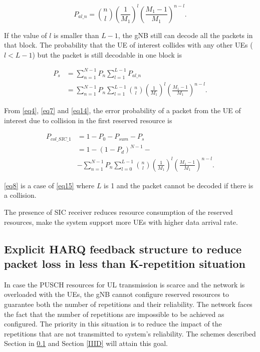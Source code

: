 \documentclass{ieeeaccess}
\begin{document}
\begin{equation}
P_{al\_n} = \binom {n}{l}\left(\frac{1}{M_{1}}\right)^{l}
\left(\frac {M_{1}-1}{M_{1}}\right)^{n-l}.\label{eq13}
\end{equation}

If the value of $l$ is smaller than $L-1$, the gNB still can decode all the packets in that block. The probability that the UE of interest collides with any other UEs ($l<L-1$) but the packet is still decodable in one block is

\begin{align}
P_{s} &= \sum_{n=1}^{N-1} P_{n}\sum_{l=1}^{L-1}P_{al\_n} \nonumber\\
 &= \sum_{n=1}^{N-1} P_{n}\sum_{l=1}^{L-1}\binom {n}{l}\left(\frac{1}{M_{1}}\right)^{l}
\left(\frac {M_{1}-1}{M_{1}}\right)^{n-l}.\label{eq14}
\end{align}

From \eqref{eq4}, \eqref{eq7} and \eqref{eq14}, the error probability of a packet from the UE of interest due to collision in the first reserved resource is

\begin{align}
P_{col\_SIC\_1} &= 1 - P_{0} - P_{sum} - P_{s} \nonumber\\
 &= 1- (1-P_{d})^{N-1} - \nonumber\\
 &- \sum_{n=1}^{N-1} P_{n}\sum_{l=0}^{L-1}\binom {n}{l}\left(\frac{1}{M_{1}}\right)^{l}
\left(\frac {M_{1}-1}{M_{1}}\right)^{n-l}.\label{eq15}
\end{align}

\eqref{eq8} is a case of \eqref{eq15} where $L$ is 1 and the packet cannot be decoded if there is a collision. 

The presence of SIC receiver reduces resource consumption of the reserved resources, make the system support more UEs with higher data arrival rate.

\subsection{Explicit HARQ feedback structure to reduce packet loss in less than K-repetition situation}\label{IIIC}

In case the PUSCH resources for UL transmission is scarce and the network is overloaded with the UEs, the gNB cannot configure reserved resources to guarantee both the number of repetitions and their reliability. The network faces the fact that the number of repetitions are impossible to be achieved as configured. The priority in this situation is to reduce the impact of the repetitions that are not transmitted to system's reliability. The schemes described Section in \ref{IIIC} and Section \ref{IIID} will attain this goal.
\end{document}
